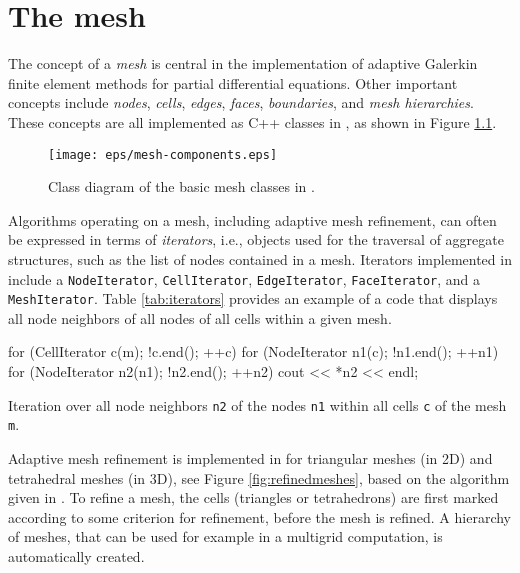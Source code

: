 \chapter{The mesh}



The concept of a \emph{mesh} is central in the implementation of
adaptive Galerkin finite element methods for partial differential equations.
Other important concepts include \emph{nodes}, \emph{cells},
\emph{edges}, \emph{faces}, \emph{boundaries}, and \emph{mesh hierarchies}. These 
concepts are all implemented as C++ classes in \dolfin{}, as shown in Figure \ref{fig:meshclasses}.

\begin{figure}[htbp]
  \begin{center}
    \texttt{[image: eps/mesh-components.eps]}
    \caption{Class diagram of the basic mesh classes in \dolfin{}.}
    \label{fig:meshclasses}
  \end{center}
\end{figure}

Algorithms operating on a mesh, including adaptive mesh refinement,
can often be expressed in terms of
\emph{iterators}, i.e., objects used for the traversal of aggregate
structures, such as the list of nodes contained in a mesh. Iterators
implemented in \dolfin{} include a \texttt{NodeIterator},
\texttt{CellIterator}, \texttt{Edge}\-\texttt{Iterator}, \texttt{FaceIterator},
and a \texttt{MeshIterator}. Table \ref{tab:iterators} provides an example of a code that
displays all node neighbors of all nodes of all cells within a
given mesh.

\begin{table}[htbp]
\begin{code}
  for (CellIterator c(m); !c.end(); ++c)
    for (NodeIterator n1(c); !n1.end(); ++n1)
      for (NodeIterator n2(n1); !n2.end(); ++n2)
        cout << *n2 << endl;
\end{code}
\caption{Iteration over all node neighbors \texttt{n2} of the nodes
\texttt{n1} within all cells \texttt{c} of the mesh \texttt{m}.}
\label{tab:iterators}
\end{table}

Adaptive mesh refinement is implemented in \dolfin{} for triangular
meshes (in 2D) and tetrahedral meshes (in 3D), see Figure
\ref{fig:refinedmeshes}, based on the algorithm given in \cite{Bey95}.
To refine a mesh, the cells (triangles or tetrahedrons) are first
marked according to some criterion for refinement, before the mesh is
refined. A hierarchy of meshes, that can be used for example in a
multigrid computation, is automatically created.

